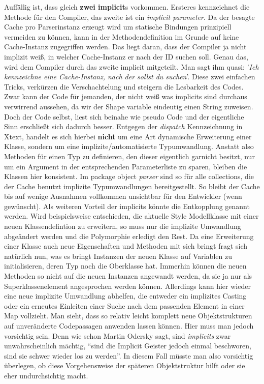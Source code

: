 Auffällig ist, dass gleich \textbf{zwei implicit}s vorkommen. Ersteres kennzeichnet die Methode für den Compiler, das zweite ist ein \textit{implicit parameter}. Da der besagte Cache pro Parserinstanz erzeugt wird um statische Bindungen prinzipiell vermeiden zu können, kann in der Methodendefinition im Grunde auf keine Cache-Instanz zugegriffen werden. Das liegt daran, dass der Compiler ja nicht implizit weiß, in welcher Cache-Instanz er nach der ID suchen soll. Genau das, wird dem Compiler durch das zweite implicit mitgeteilt. Man sagt ihm quasi: '\textit{Ich kennzeichne eine Cache-Instanz, nach der sollst du suchen}'. Diese zwei einfachen Tricks, verkürzen die Verschachtelung und steigern die Lesbarkeit des Codes. Zwar kann der Code für jemanden, der nicht weiß was implicits sind durchaus verwirrend aussehen, da wir der Shape variable eindeutig einen String zuweisen. Doch der Code selbst, liest sich beinahe wie pseudo Code und der eigentliche Sinn erschließt sich dadurch besser. Entgegen der \textit{dispatch} Kennzeichnung in Xtext, handelt es sich hierbei \textbf{nicht} um eine Art dynamische Erweiterung einer Klasse, sondern um eine implizite/automatisierte Typumwandlung. Anstatt also Methoden für einen Typ zu definieren, den dieser eigentlich garnicht besitzt, nur um ein Argument in der entsprechenden Parameterliste zu sparen, bleiben die Klassen hier konsistent. Im package object \textit{parser} sind so für alle collections, die der Cache benutzt implizite Typumwandlungen bereitgestellt. So bleibt der Cache bis auf wenige Ausnahmen vollkommen unsichtbar für den Entwickler (wenn gewünscht). Als weiteren Vorteil der implicits könnte die Entkopplung genannt werden. Wird beispielsweise entschieden, die aktuelle Style Modellklasse mit einer neuen Klassendefintion zu erweitern, so muss nur die implizite Umwandlung abgeändert werden und die Polymorphie erledigt den Rest. Da eine Erweiterung einer Klasse auch neue Eigenschaften und Methoden mit sich bringt fragt sich natürlich nun, was es bringt Instanzen der neuen Klasse auf Variablen zu initialisieren, deren Typ noch die Oberklasse hat. Immerhin können die neuen Methoden so nicht auf die neuen Instanzen angewandt werden, da sie ja nur als Superklassenelement angesprochen werden können. Allerdings kann hier wieder eine neue implizite Umwandlung abhelfen, die entweder ein implizites Casting oder ein erneutes Einleiten einer Suche nach dem passenden Element in einer Map vollzieht. Man sieht, dass so relativ leicht komplett neue Objektstrukturen auf unveränderte Codepassagen anwenden lassen können. Hier muss man jedoch vorsichtig sein. Denn wie schon Martin Odersky sagt, sind \textit{implicits} zwar unwahrscheinlich mächtig, "`sind die Implicit Geister jedoch einmal beschworen, sind sie schwer wieder los zu werden"'. %
In diesem Fall müsste man also vorsichtig überlegen, ob diese Vorgehensweise der späteren Objektstruktur hilft oder sie eher undurchsichtig macht.

